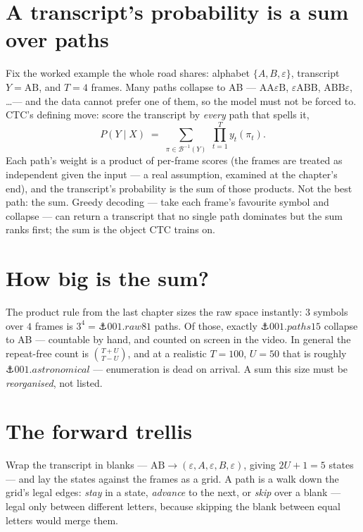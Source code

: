 \begin{narrative}
\section{A transcript's probability is a sum over paths}

Fix the worked example the whole road shares: alphabet $\{A, B,
\varepsilon\}$, transcript $Y = \mathrm{AB}$, and $T = 4$ frames. Many
paths collapse to AB — $\mathrm{A}\mathrm{A}\varepsilon\mathrm{B}$,
$\varepsilon\mathrm{A}\mathrm{B}\mathrm{B}$,
$\mathrm{A}\mathrm{B}\mathrm{B}\varepsilon$, \dots — and the data cannot
prefer one of them, so the model must not be forced to. CTC's defining
move: score the transcript by \emph{every} path that spells it,
\[
  P(Y \mid X) \;=\; \sum_{\pi \in \mathcal{B}^{-1}(Y)}
    \;\prod_{t=1}^{T} y_t(\pi_t) .
\]
Each path's weight is a product of per-frame scores (the frames are
treated as independent given the input — a real assumption, examined at
the chapter's end), and the transcript's probability is the sum of those
products. Not the best path: the sum. Greedy decoding — take each
frame's favourite symbol and collapse — can return a transcript that no
single path dominates but the sum ranks first; the sum is the object
CTC trains on.

\section{How big is the sum?}

The product rule from the last chapter sizes the raw space instantly:
$3$ symbols over $4$ frames is $3^4 = \anchor{001.raw81}$ paths. Of
those, exactly $\anchor{001.paths15}$ collapse to AB — countable by
hand, and counted on screen in the video. In general the repeat-free
count is $\binom{T+U}{T-U}$, and at a realistic $T = 100$, $U = 50$
that is roughly $\anchor{001.astronomical}$ — enumeration is dead on
arrival. A sum this size must be \emph{reorganised}, not listed.

\section{The forward trellis}

Wrap the transcript in blanks — $\mathrm{AB} \to (\varepsilon, A,
\varepsilon, B, \varepsilon)$, giving $2U + 1 = 5$ states — and lay the
states against the frames as a grid. A path is a walk down the grid's
legal edges: \emph{stay} in a state, \emph{advance} to the next, or
\emph{skip} over a blank — legal only between different letters, because
skipping the blank between equal letters would merge them.


\end{narrative}
